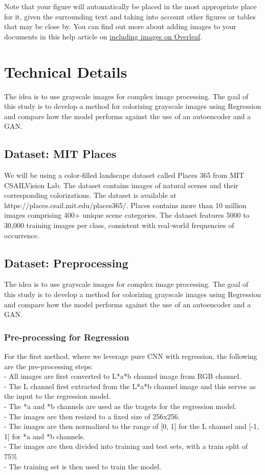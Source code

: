 \documentclass{article}
\begin{document}
Note that your figure will automatically be placed in the most appropriate place for it, given the surrounding text and taking into account other figures or tables that may be close by. You can find out more about adding images to your documents in this help article on \href{https://www.overleaf.com/learn/how-to/Including_images_on_Overleaf}{including images on Overleaf}.

\section{Technical Details}
The idea is to use grayscale images for complex image processing. The goal of this
study is to develop a method for colorizing grayscale images using Regression and
compare how the model performs against the use of an autoencoder and a GAN. 

\subsection{Dataset: MIT Places}
We will be using a color-filled landscape dataset called Places 365 from MIT CSAILVision Lab. 
The dataset contains images of natural scenes and their corresponding colorizations. 
The dataset is available at https://places.csail.mit.edu/places365/. 
Places contains more than 10 million images comprising 400+ unique scene categories. 
The dataset features 5000 to 30,000 training images per class, consistent with real-world frequencies of occurrence. 

\subsection{Dataset: Preprocessing}
The idea is to use grayscale images for complex image processing. The goal of this
study is to develop a method for colorizing grayscale images using Regression and
compare how the model performs against the use of an autoencoder and a GAN. 

\subsubsection{Pre-processing for Regression}
For the first method, where we leverage pure CNN with regression, the following are the pre-processing steps:\\
    - All images are first converted to L*a*b channel image from RGB channel. \\
    - The L channel first extracted from the L*a*b channel image and this serves as the input to the regression model. \\
    - The *a and *b channels are used as the tragets for the regression model. \\
    - The images are then resized to a fixed size of 256x256. \\
    - The images are then normalized to the range of [0, 1] for the L channel and [-1, 1] for *a and *b channels. \\
    - The images are then divided into training and test sets, with a train split of 75\% \\
    - The training set is then used to train the model. \\
\end{document}
